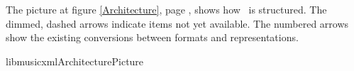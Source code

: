 The picture at figure \ref {Architecture}, page \pageref {Architecture}, shows how \lib\ is structured. The dimmed, dashed arrows indicate items not yet available. 
The numbered arrows show the existing conversions between formats and representations.

{libmusicxmlArchitecturePicture}

